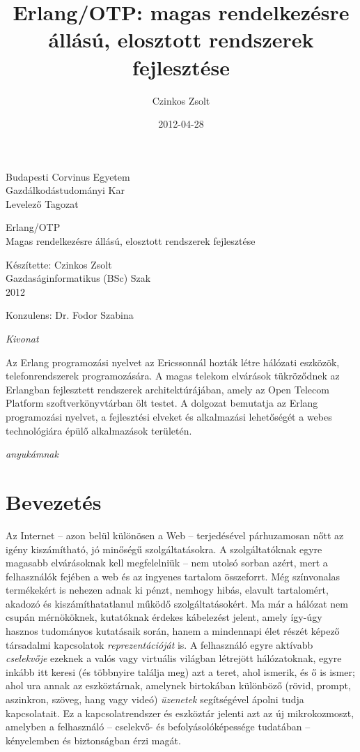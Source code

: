 \documentclass[12pt, a4paper, oneside]{book}
\author{Czinkos Zsolt}
\title{Erlang/OTP: magas rendelkezésre állású, elosztott rendszerek fejlesztése}
\date{2012-04-28}
\newenvironment{abstract}
{\newpage \pagestyle{empty} \vspace*{\fill} \begin{center}\em{Kivonat}\end{center}}
{\vspace*{\fill} \newpage}
\renewcommand{\maketitle}{
\begin{titlepage}
\noindent Budapesti Corvinus Egyetem\\
Gazdálkodástudományi Kar\\
Levelező Tagozat\\

\vspace{6cm}

\begin{center}
\Large{Erlang/OTP}\\
\vspace{0.3cm}
\large{Magas rendelkezésre állású, elosztott rendszerek
fejlesztése}
\end{center}

\vfill

\begin{flushright}
Készítette: Czinkos Zsolt\\
Gazdaságinformatikus (BSc) Szak\\
2012\\
\end{flushright}

\vspace{0.5cm}

\begin{center}
Konzulens: Dr. Fodor Szabina
\end{center}

\end{titlepage}
}
\begin{document}
\maketitle

\onehalfspacing

\begin{abstract}
Az Erlang programozási nyelvet az Ericssonnál hozták létre hálózati
eszközök, telefonrendszerek programozására. A magas telekom elvárások
tükröződnek az Erlangban fejlesztett rendszerek architektúrájában,
amely az Open Telecom Platform szoftverkönyvtárban ölt testet. A dolgozat
bemutatja az Erlang programozási nyelvet, a fejlesztési elveket és
alkalmazási lehetőségét a webes technológiára épülő alkalmazások területén.
\end{abstract}

\newpage
\pagestyle{empty}
\vspace*{\fill} 
\hfill \emph{anyukámnak}
\vspace*{\fill} 
\newpage

\pagestyle{fancy}

\tableofcontents

\chapter{Bevezetés}

Az Internet -- azon belül különösen a Web -- terjedésével párhuzamosan nőtt az
igény kiszámítható, jó minőségű szolgáltatásokra. A szolgáltatóknak egyre
magasabb elvárásoknak kell megfelelniük -- nem utolsó sorban azért, mert a
felhasználók fejében a web és az ingyenes tartalom összeforrt. Még színvonalas
termékekért is nehezen adnak ki pénzt, nemhogy hibás, elavult tartalomért,
akadozó és kiszámíthatatlanul működő szolgáltatásokért. Ma már a hálózat nem
csupán mérnököknek, kutatóknak érdekes kábelezést jelent, amely így-úgy hasznos
tudományos kutatásaik során, hanem a mindennapi élet részét képező társadalmi
kapcsolatok \textit{reprezentációját} is. A felhasználó egyre aktívabb
\textit{cselekvője} ezeknek a valós vagy virtuális világban létrejött
hálózatoknak, egyre inkább itt keresi (és többnyire találja meg) azt a teret,
ahol ismerik, és ő is ismer; ahol ura annak az eszköztárnak, amelynek
birtokában különböző (rövid, prompt, aszinkron, szöveg, hang vagy videó)
\textit{üzenetek} segítségével ápolni tudja kapcsolatait. Ez a
kapcsolatrendszer és eszköztár jelenti azt az új mikrokozmoszt, amelyben a
felhasználó -- cselekvő- és befolyásolóképessége tudatában -- kényelemben és
biztonságban érzi magát.
\end{document}
